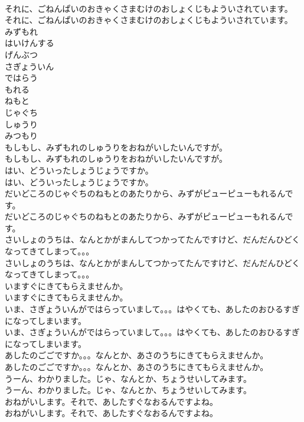 \documentclass[8pt]{extreport}
\begin{document}
\begin{CJK}{UTF8}{min}
\\	それに、ごねんぱいのおきゃくさまむけのおしょくじもよういされています。	
\\	それに、ごねんぱいのおきゃくさまむけのおしょくじもよういされています。 
\\	みずもれ
\\	はいけんする
\\	げんぶつ
\\	さぎょういん
\\	ではらう
\\	もれる
\\	ねもと
\\	じゃぐち
\\	しゅうり
\\	みつもり
\\	もしもし、みずもれのしゅうりをおねがいしたいんですが。	
\\	もしもし、みずもれのしゅうりをおねがいしたいんですが。 
\\	はい、どういったしょうじょうですか。	
\\	はい、どういったしょうじょうですか。 
\\	だいどころのじゃぐちのねもとのあたりから、みずがピューピューもれるんです。	
\\	だいどころのじゃぐちのねもとのあたりから、みずがピューピューもれるんです。 
\\	さいしょのうちは、なんとかがまんしてつかってたんですけど、だんだんひどくなってきてしまって。。。	
\\	さいしょのうちは、なんとかがまんしてつかってたんですけど、だんだんひどくなってきてしまって。。。 
\\	いますぐにきてもらえませんか。	
\\	いますぐにきてもらえませんか。 
\\	いま、さぎょういんがではらっていまして。。。はやくても、あしたのおひるすぎになってしまいます。	
\\	いま、さぎょういんがではらっていまして。。。はやくても、あしたのおひるすぎになってしまいます。 
\\	あしたのごごですか。。。なんとか、あさのうちにきてもらえませんか。	
\\	あしたのごごですか。。。なんとか、あさのうちにきてもらえませんか。 
\\	うーん、わかりました。じゃ、なんとか、ちょうせいしてみます。	
\\	うーん、わかりました。じゃ、なんとか、ちょうせいしてみます。 
\\	おねがいします。それで、あしたすぐなおるんですよね。	
\\	おねがいします。それで、あしたすぐなおるんですよね。 

\end{CJK}
\end{document}
